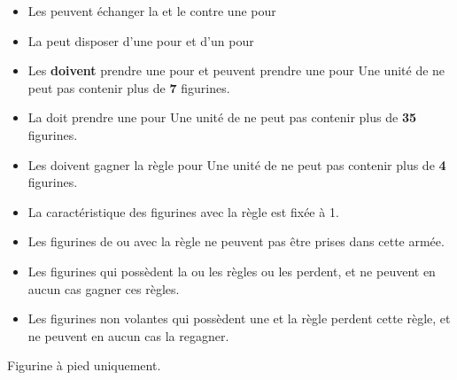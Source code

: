 \begin{multicols}{2}
\begin{itemize}[label={-}, leftmargin=*]
\item Les \skeletons{} peuvent échanger la \spear{} et le \shield{} contre une \halberd{} pour \permodel{}

\item La \skeletoncavalry{} peut disposer d'une \lance{} pour \permodel{} et d'un \barding{} pour \permodel{}

\item Les \skeletonchariots{} \textbf{doivent} prendre une \ha{} pour \permodel{} et peuvent prendre une \halberd{} pour \permodel{} Une unité de \skeletonchariots{} ne peut pas contenir plus de \textbf{7} figurines.

\item La \necropolisguard{} doit prendre une \ha{} pour \permodel{} Une unité de \necropolisguard{} ne peut pas contenir plus de \textbf{35} figurines.

\item Les \scarabswarms{} doivent gagner la règle \ethereal{} pour \permodel{} Une unité de \scarabswarms{} ne peut pas contenir plus de \textbf{4} figurines.

\item La caractéristique \risen{} des figurines avec la règle \ethereal{} est fixée à 1.

\item Les figurines de \monstrouscavalry{} ou avec la règle \largetarget{} ne peuvent pas être prises dans cette armée.

\item Les figurines qui possèdent la ou les règles \undergroundambush{} ou \scout{} les perdent, et ne peuvent en aucun cas gagner ces règles.

\item Les figurines non volantes qui possèdent une \ha{} et la règle \lighttroops{} perdent cette règle, et ne peuvent en aucun cas la regagner.
\end{itemize}

\vspace*{\fill}\end{multicols}

\closearmynewsection








\startarmymagicalitems

\armymagicalweapons

\startpricelist

Figurine à pied uniquement.

